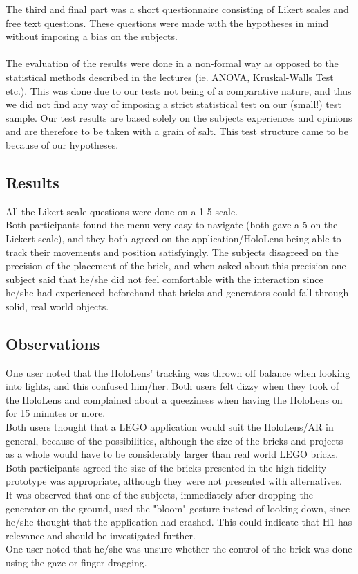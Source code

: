 The third and final part was a short questionnaire consisting of Likert scales and free text questions. These questions were made with the hypotheses in mind without imposing a bias on the subjects.\\
\\
The evaluation of the results were done in a non-formal way as opposed to the statistical methods described in the lectures (ie. ANOVA, Kruskal-Walls Test etc.). This was done due to our tests not being of a comparative nature, and thus we did not find any way of imposing a strict statistical test on our (small!) test sample. Our test results are based solely on the subjects experiences and opinions and are therefore to be taken with a grain of salt. This test structure came to be because of our hypotheses.

\subsection{Results}
All the Likert scale questions were done on a 1-5 scale.\\
Both participants found the menu very easy to navigate (both gave a 5 on the Lickert scale), and they both agreed on the application/HoloLens being able to track their movements and position satisfyingly. The subjects disagreed on the precision of the placement of the brick, and when asked about this precision one subject said that he/she did not feel comfortable with the interaction since he/she had experienced beforehand that bricks and generators could fall through solid, real world objects.\\

\subsection{Observations}
One user noted that the HoloLens' tracking was thrown off balance when looking into lights, and this confused him/her. Both users felt dizzy when they took of the HoloLens and complained about a queeziness when having the HoloLens on for 15 minutes or more.\\
Both users thought that a LEGO application would suit the HoloLens/AR in general, because of the possibilities, although the size of the bricks and projects as a whole would have to be considerably larger than real world LEGO bricks. Both participants agreed the size of the bricks presented in the high fidelity prototype was appropriate, although they were not presented with alternatives.\\
It was observed that one of the subjects, immediately after dropping the generator on the ground, used the "bloom" gesture instead of looking down, since he/she thought that the application had crashed. This could indicate that H1 has relevance and should be investigated further.\\
One user noted that he/she was unsure whether the control of the brick was done using the gaze or finger dragging.